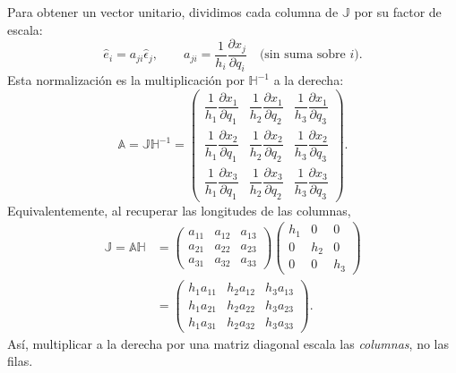 Para obtener un vector unitario, dividimos cada columna de $\mathbb J$ por su factor de escala:
\[
\hat e_i=a_{ji}\hat\epsilon_j,
\qquad
 a_{ji}=\frac{1}{h_i}\frac{\partial x_j}{\partial q_i}
\quad\text{(sin suma sobre $i$)}.
\]
Esta normalización es la multiplicación por $\mathbb H^{-1}$ a la derecha:
\[
\boxed{\mathbb A=\mathbb J\mathbb H^{-1}}
=\begin{pmatrix}
\dfrac{1}{h_1}\dfrac{\partial x_1}{\partial q_1}&\dfrac{1}{h_2}\dfrac{\partial x_1}{\partial q_2}&\dfrac{1}{h_3}\dfrac{\partial x_1}{\partial q_3}\\[6pt]
\dfrac{1}{h_1}\dfrac{\partial x_2}{\partial q_1}&\dfrac{1}{h_2}\dfrac{\partial x_2}{\partial q_2}&\dfrac{1}{h_3}\dfrac{\partial x_2}{\partial q_3}\\[6pt]
\dfrac{1}{h_1}\dfrac{\partial x_3}{\partial q_1}&\dfrac{1}{h_2}\dfrac{\partial x_3}{\partial q_2}&\dfrac{1}{h_3}\dfrac{\partial x_3}{\partial q_3}
\end{pmatrix}.
\]
Equivalentemente, al recuperar las longitudes de las columnas,
\[
\begin{aligned}
\mathbb J=\mathbb A\mathbb H
&=\begin{pmatrix}
a_{11}&a_{12}&a_{13}\\
a_{21}&a_{22}&a_{23}\\
a_{31}&a_{32}&a_{33}
\end{pmatrix}
\begin{pmatrix}h_1&0&0\\0&h_2&0\\0&0&h_3\end{pmatrix}\\[4pt]
&=\begin{pmatrix}
h_1a_{11}&h_2a_{12}&h_3a_{13}\\
h_1a_{21}&h_2a_{22}&h_3a_{23}\\
h_1a_{31}&h_2a_{32}&h_3a_{33}
\end{pmatrix}.
\end{aligned}
\]
Así, multiplicar a la derecha por una matriz diagonal escala las \emph{columnas}, no las filas.

